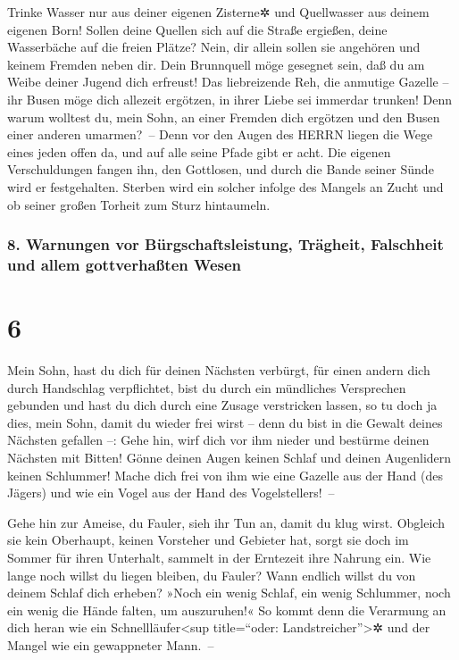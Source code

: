 Trinke Wasser nur aus deiner eigenen Zisterne✲ und
Quellwasser aus deinem eigenen Born! Sollen deine Quellen
sich auf die Straße ergießen, deine Wasserbäche auf die freien Plätze?
Nein, dir allein sollen sie angehören und keinem Fremden
neben dir. Dein Brunnquell möge gesegnet sein, daß du am
Weibe deiner Jugend dich erfreust! Das liebreizende Reh,
die anmutige Gazelle -- ihr Busen möge dich allezeit ergötzen, in ihrer
Liebe sei immerdar trunken! Denn warum wolltest du, mein
Sohn, an einer Fremden dich ergötzen und den Busen einer anderen
umarmen?~-- Denn vor den Augen des HERRN liegen die Wege
eines jeden offen da, und auf alle seine Pfade gibt er acht.
Die eigenen Verschuldungen fangen ihn, den Gottlosen, und
durch die Bande seiner Sünde wird er festgehalten.
Sterben wird ein solcher infolge des Mangels an Zucht und
ob seiner großen Torheit zum Sturz hintaumeln.

\hypertarget{warnungen-vor-buxfcrgschaftsleistung-truxe4gheit-falschheit-und-allem-gottverhauxdften-wesen}{%
\subsubsection{8. Warnungen vor Bürgschaftsleistung, Trägheit,
Falschheit und allem gottverhaßten
Wesen}\label{warnungen-vor-buxfcrgschaftsleistung-truxe4gheit-falschheit-und-allem-gottverhauxdften-wesen}}

\hypertarget{section-5}{%
\section{6}\label{section-5}}

Mein Sohn, hast du dich für deinen Nächsten verbürgt, für
einen andern dich durch Handschlag verpflichtet, bist du
durch ein mündliches Versprechen gebunden und hast du dich durch eine
Zusage verstricken lassen, so tu doch ja dies, mein Sohn,
damit du wieder frei wirst -- denn du bist in die Gewalt deines Nächsten
gefallen --: Gehe hin, wirf dich vor ihm nieder und bestürme deinen
Nächsten mit Bitten! Gönne deinen Augen keinen Schlaf und
deinen Augenlidern keinen Schlummer! Mache dich frei von
ihm wie eine Gazelle aus der Hand (des Jägers) und wie ein Vogel aus der
Hand des Vogelstellers!~--

Gehe hin zur Ameise, du Fauler, sieh ihr Tun an, damit du
klug wirst. Obgleich sie kein Oberhaupt, keinen Vorsteher
und Gebieter hat, sorgt sie doch im Sommer für ihren
Unterhalt, sammelt in der Erntezeit ihre Nahrung ein. Wie
lange noch willst du liegen bleiben, du Fauler? Wann endlich willst du
von deinem Schlaf dich erheben? »Noch ein wenig Schlaf,
ein wenig Schlummer, noch ein wenig die Hände falten, um auszuruhen!«
So kommt denn die Verarmung an dich heran wie ein
Schnellläufer\textless sup title=``oder: Landstreicher''\textgreater✲
und der Mangel wie ein gewappneter Mann.~--

